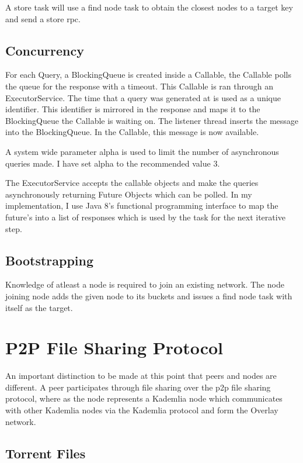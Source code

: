 \documentclass{article}
\begin{document}
A store task will use a find node task to obtain the closest nodes to a target key and send a store rpc.

\subsection{Concurrency}

For each Query, a BlockingQueue is created inside a Callable, the Callable polls the queue for the response with a timeout. This Callable is ran through an ExecutorService. The time that a query was generated at is used as a unique identifier. This identifier is mirrored in the response and maps it to the BlockingQueue the Callable is waiting on. The listener thread inserts the message into the BlockingQueue. In the Callable, this message is now available. 

A system wide parameter alpha is used to limit the number of asynchronous queries made. I have set alpha to the recommended value 3.

The ExecutorService accepts the callable objects and make the queries asynchronously returning Future Objects which can be polled. In my implementation, I use Java 8's functional programming interface to map the future's into a list of responses which is used by the task for the next iterative step.

\subsection{Bootstrapping}

Knowledge of atleast a node is required to join an existing network. The node joining node adds the given node to its buckets and issues a find node task with itself as the target.

\section{P2P File Sharing Protocol}

An important distinction to be made at this point that peers and nodes are different. A peer participates through file sharing over the p2p file sharing protocol, where as the node represents a Kademlia node which communicates with other Kademlia nodes via the Kademlia protocol and form the Overlay network.

\subsection{Torrent Files}
\end{document}
